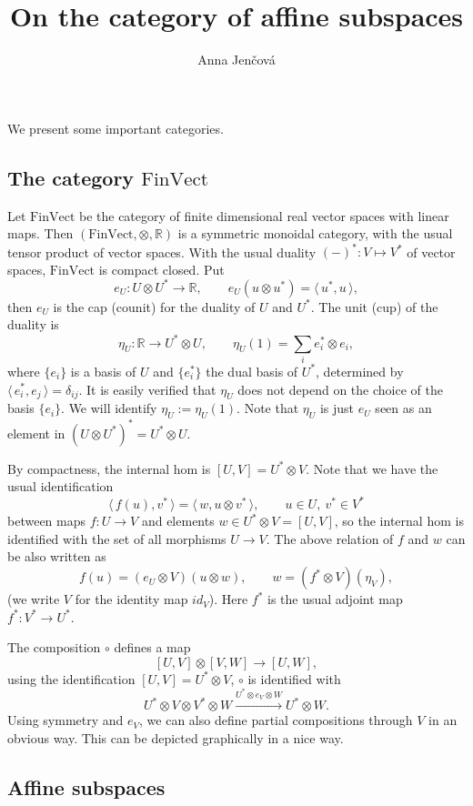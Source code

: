 \documentclass[12pt]{article}
\title{On the category of affine subspaces}
\author{Anna Jen\v cov\'a}
\theoremstyle{definition}
\theoremstyle{remark}
\def\<{\langle\,}
\def\>{\,\rangle}
\def \FV{\mathrm{FinVect}}
\begin{document}
\maketitle

We present some important categories.

\subsection{The category $\FV$}

Let  $\FV$ be the category of finite dimensional real vector spaces with linear maps. Then
$(\FV,\otimes, \mathbb R)$ is a symmetric monoidal category, with the usual tensor product
of vector spaces. With the usual duality $(-)^*: V\mapsto V^*$  of vector spaces, $\FV$ is
compact closed.  Put
\[
e_U: U\otimes U^*\to \mathbb R,\qquad e_U(u\otimes u^*)=\<u^*,u\>,
\]
then $e_U$ is the cap (counit) for the duality of $U$ and $U^*$. The unit (cup) of the
duality is 
\[
\eta_U: \mathbb R\to U^*\otimes U, \qquad \eta_U(1)=\sum_i e_i^*\otimes e_i,
\]
where $\{e_i\}$ is a basis of $U$ and $\{e_i^*\}$ the dual basis of $U^*$, determined by
$\<e_i^*,e_j\>=\delta_{ij}$. It is easily verified that $\eta_U$ does not depend on the
choice of the basis $\{e_i\}$. We will identify $\eta_U:=\eta_U(1)$. Note that $\eta_U$ is
just $e_U$ seen as an element in $(U\otimes U^*)^*=U^*\otimes U$.

By compactness, the internal hom is  $[U,V]=U^*\otimes V$. Note that we have the usual identification 
\begin{equation}\label{eq:fvhoms}
\<f(u),v^*\>=\<w,u\otimes v^*\>,\qquad u\in U,\
v^*\in V^*
\end{equation}
between maps $f:U\to V$ and elements $w\in U^*\otimes V=[U,V]$, so the internal hom is
identified with  the set of all morphisms $U\to V$.  The above relation of $f$ and $w$ can be also
written as
\[
f(u)=(e_U\otimes V)(u\otimes w),\qquad 
w=(f^*\otimes V)(\eta_V),
\]
(we write $V$ for the identity map  $id_V$). Here $f^*$ is the usual adjoint map
$f^*:V^*\to U^*$.  

The composition $\circ$ defines a map
\[
[U,V]\otimes [V,W]\to [U,W],
\]
using the identification $[U,V]=U^*\otimes V$, $\circ$ is identified with 
\[
U^*\otimes V\otimes V^*\otimes W\xrightarrow{U^*\otimes e_V\otimes W} U^*\otimes W.
\]
Using symmetry and $e_V$, we can also define partial compositions through $V$ in an obvious way.
This can be depicted graphically in a nice way.


\subsection{Affine subspaces}
\end{document}
